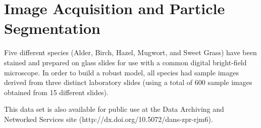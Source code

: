 \section{Image Acquisition and Particle Segmentation}

Five different species (Alder, Birch, Hazel, Mugwort, and Sweet Grass) have been stained and prepared on glass slides for use with a common digital bright-field microscope. In order to build a robust model, all species had sample images derived from three distinct laboratory slides (using a total of 600 sample images obtained from 15 different slides).
  
This data set is also available for public use at the Data Archiving and Networked Services site (http://dx.doi.org/10.5072/dans-zpr-rjm6).
  
  
  
  
  